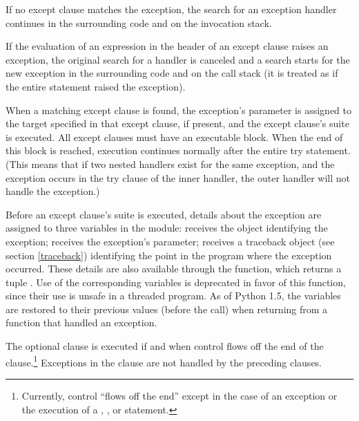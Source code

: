 If no except clause matches the exception, the search for an exception
handler continues in the surrounding code and on the invocation stack.

If the evaluation of an expression in the header of an except clause
raises an exception, the original search for a handler is canceled
and a search starts for the new exception in the surrounding code and
on the call stack (it is treated as if the entire  statement
raised the exception).

When a matching except clause is found, the exception's parameter is
assigned to the target specified in that except clause, if present,
and the except clause's suite is executed.  All except clauses must
have an executable block.  When the end of this block
is reached, execution continues normally after the entire try
statement.  (This means that if two nested handlers exist for the same
exception, and the exception occurs in the try clause of the inner
handler, the outer handler will not handle the exception.)

Before an except clause's suite is executed, details about the
exception are assigned to three variables in the
 module:  receives
the object identifying the exception;  receives
the exception's parameter;  receives a
traceback object (see section \ref{traceback})
identifying the point in the program where the exception occurred.
These details are also available through the 
function, which returns a tuple .  Use of the corresponding variables is
deprecated in favor of this function, since their use is unsafe in a
threaded program.  As of Python 1.5, the variables are restored to
their previous values (before the call) when returning from a function
that handled an exception.

The optional  clause is executed if and when control
flows off the end of the  clause.\footnote{
  Currently, control ``flows off the end'' except in the case of an
  exception or the execution of a ,
  , or  statement.
} Exceptions in the  clause are not handled by the
preceding  clauses.

